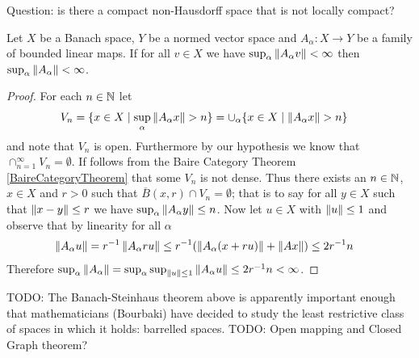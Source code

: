 Question: is there a compact non-Hausdorff space that is not locally compact?

\begin{thm}\label{PrincipleOfUniformBoundedness}Let $X$ be a Banach space, $Y$ be a normed vector space and
  $A_\alpha : X \to Y$ be a family of bounded linear maps.  If for all
  $v \in X$ we have $\sup_\alpha \left \lVert A_\alpha v \right \rVert <\infty$ then
  $\sup_\alpha \left \lVert A_\alpha \right \rVert < \infty$.
\end{thm}
\begin{proof}
For each $n \in \mathbb{N}$ let 
\begin{align*}
V_n &= \lbrace x \in X \mid \sup_\alpha
\left \lVert A_\alpha x \right \rVert > n \rbrace
= \cup_\alpha \lbrace x \in X \mid \left \lVert A_\alpha x \right \rVert > n \rbrace
\end{align*}
 and note that $V_n$ is open.
Furthermore by our hypothesis we know that $\cap_{n=1}^\infty V_n =
\emptyset$.  If follows from the Baire Category Theorem
\ref{BaireCategoryTheorem} that some $V_n$ is not dense.  Thus there
exists an $n \in \mathbb{N}$, $x \in X$ and $r > 0$ such that
$\overline{B}(x,r) \cap V_n = \emptyset$; that is to say for all $y
\in X$ such that $\left \lVert x-y \right \rVert \leq r$ we have $\sup_\alpha
\left \lVert A_\alpha y \right \rVert \leq n$.  
Now let $u \in X$ with
$\left \lVert u \right \rVert \leq 1$ and observe that by linearity for all $\alpha$ 
\begin{align*} 
\left \lVert A_\alpha u \right \rVert &=
r^{-1} \left \lVert A_\alpha ru \right \rVert  \leq r^{-1}( \left \lVert A_\alpha (x + ru)  \right \rVert +
                    \left \lVert A x \right \rVert) \leq 2 r^{-1} n
\end{align*}
Therefore $\sup_\alpha \left \lVert A_\alpha \right \rVert = \sup_\alpha \sup_{\left \lVert u \right \rVert
  \leq 1} \left \lVert A_\alpha u \right \rVert  \leq 2 r^{-1} n < \infty$.
\end{proof}

TODO: The Banach-Steinhaus theorem above is apparently important enough that mathematicians (Bourbaki) have decided to study the least restrictive class of spaces in which it holds: barrelled spaces.
TODO: Open mapping and Closed Graph theorem?

